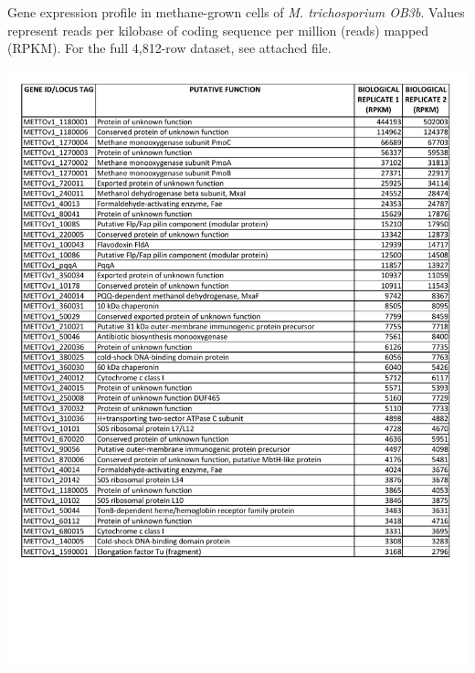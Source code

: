 \begin{table}[H]
\begin{singlespace}
\caption[Methane-grown \textit{M. trichosporium OB3b} gene expression table (RPKM)]{
	Gene expression profile in methane-grown cells of \textit{M. trichosporium OB3b}.
	Values represent reads per kilobase of coding sequence per million (reads) mapped (RPKM).
	For the full 4,812-row dataset, see attached file.}
\label{table:ChA_S2}
\includegraphics[width=1.0\textwidth]{./tex/chapter1/figures/supplemental/TableS2a.pdf}
\end{singlespace}
\end{table}

